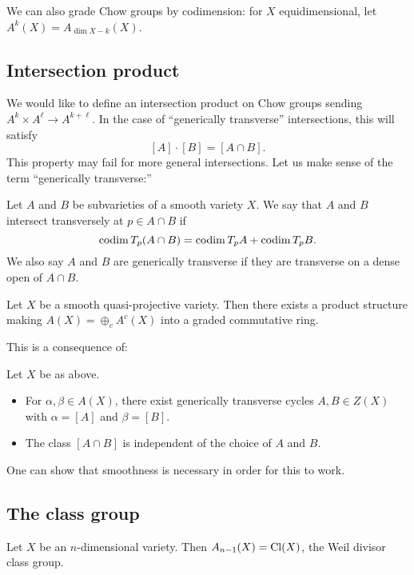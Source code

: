 \documentclass{article}
\begin{document}
We can also grade Chow groups by codimension: for $X$ equidimensional, let $A^k(X) = A_{\dim X - k}(X)$.

\subsection{Intersection product}

We would like to define an intersection product on Chow groups sending $A^k \times A^\ell \to A^{k + \ell}$.
In the case of ``generically transverse'' intersections, this will satisfy
\[
	[A] \cdot [B] = [A \cap B].
\]
This property may fail for more general intersections.
Let us make sense of the term ``generically transverse:''

\begin{dfn}
	Let $A$ and $B$ be subvarieties of a smooth variety $X$.
	We say that $A$ and $B$ intersect transversely at $p \in A \cap B$ if
	\[
		\operatorname{codim} T_p(A \cap B) = \operatorname{codim} T_p A + \operatorname{codim} T_p B.
	\]
	We also say $A$ and $B$ are generically transverse if they are transverse on a dense open of $A \cap B$.
\end{dfn}

\begin{thm}
	Let $X$ be a smooth quasi-projective variety.
	Then there exists a product structure making $A(X) = \oplus_c A^c(X)$ into a graded commutative ring.
\end{thm}

This is a consequence of:

\begin{lem}
	Let $X$ be as above.
	\begin{itemize}
		\item For $\alpha, \beta \in A(X)$, there exist generically transverse cycles $A, B \in Z(X)$ with $\alpha = [A]$ and $\beta = [B]$.
		\item The class $[A \cap B]$ is independent of the choice of $A$ and $B$.
	\end{itemize}
\end{lem}

One can show that smoothness is necessary in order for this to work.

\subsection{The class group}

\begin{prop}
	Let $X$ be an $n$-dimensional variety.
	Then $A_{n-1}(X) = \operatorname{Cl}(X)$, the Weil divisor class group.
\end{prop}
\end{document}
